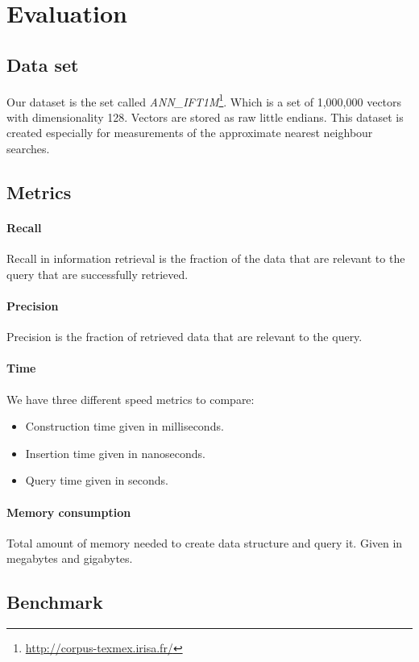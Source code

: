 \section{Evaluation}

\subsection{Data set}

Our dataset is the set called \textit{ANN\_IFT1M}\footnote{\url{http://corpus-texmex.irisa.fr/}}. Which is a set of 1,000,000 vectors with dimensionality 128. Vectors are stored as raw little endians. This dataset is created especially for measurements of the approximate nearest neighbour searches.

\subsection{Metrics}

\paragraph{Recall} Recall in information retrieval is the fraction of the data that are relevant to the query that are successfully retrieved.
\paragraph{Precision} Precision is the fraction of retrieved data that are relevant to the query.
\paragraph{Time} We have three different speed metrics to compare:

\begin{itemize}
  \item Construction time given in milliseconds.
  \item Insertion time given in nanoseconds.
  \item Query time given in seconds.
\end{itemize}

\paragraph{Memory consumption} Total amount of memory needed to create data structure and query it. Given in megabytes and gigabytes.

\subsection{Benchmark}

